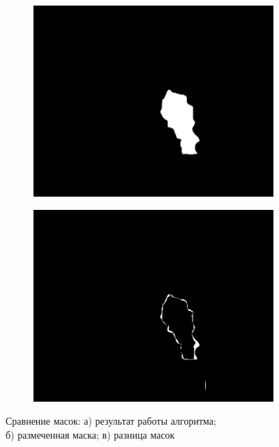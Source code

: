 \documentclass[t]{beamer}
\begin{document}
\begin{frame}
\begin{figure}[h!]
\begin{subfigure}{.30\textwidth}
				\centering
				\includegraphics[width = \textwidth]{image/examples/mask_razmet/240}
				\caption{}
			\end{subfigure}
			\begin{subfigure}{.30\textwidth}
				\centering
				\includegraphics[width = \textwidth]{image/examples/mask_dif/240}
				\caption{}
			\end{subfigure}
			\vspace{-0.3cm}
			\caption{Сравнение масок: а) результат работы алгоритма;\\ б) размеченная маска; в) разница масок}
			\label{fig:test_segm}
		\end{figure}
	\end{frame}
\end{document}
